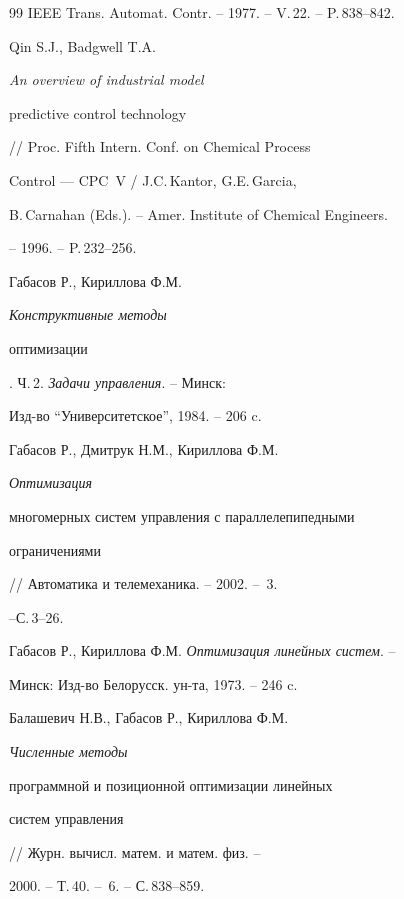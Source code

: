 \begin{thebibliography}{99}
IEEE Trans. Automat. Contr. -- 1977. -- V.\,22. -- P.\,838--842.







Qin S.J., Badgwell T.A. {\em An overview of industrial model


predictive control technology}


// Proc. Fifth Intern. Conf. on Chemical Process


Control --- CPC~V / J.C.\,Kantor, G.E.\,Garcia,


B.\,Carnahan (Eds.). -- Amer. Institute of Chemical Engineers.


--  1996. -- P.\,232--256.







Габасов Р., Кириллова Ф.М. {\em Конструктивные методы


оптимизации}. Ч.\,2. {\em Задачи управления}. -- Минск:


Изд-во ``Университетское'', 1984. -- 206 c.







Габасов Р., Дмитрук Н.М., Кириллова Ф.М. {\em Оптимизация


многомерных систем управления с параллелепипедными


ограничениями} // Автоматика и телемеханика. -- 2002. -- \No\,3.


--\linebreak С.\,3--26.







Габасов Р., Кириллова Ф.М. {\em Оптимизация линейных систем}. --


Минск: Изд-во Белорусск. ун-та, 1973. -- 246 c.







Балашевич Н.В., Габасов Р., Кириллова Ф.М. {\em Численные методы


программной и позиционной оптимизации линейных


систем управления} // Журн. вычисл. матем. и матем. физ. --


2000. -- Т.\,40. -- \No\,6. -- С.\,838--859.






\end{thebibliography}
